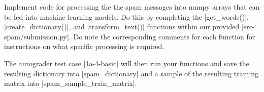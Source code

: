 \item {}
Implement code for processing the the spam messages into numpy arrays that can be fed into machine learning models. Do this by completing the |get_words()|, |create_dictionary()|, and |transform_text()| functions within our provided |src-spam/submission.py|. Do note the corresponding comments for each function for instructions on what specific processing is required.

The autograder test case |1a-4-basic| will then run your functions and save the resulting dictionary into |spam_dictionary| and a sample of the resulting training matrix into |spam_sample_train_matrix|.
